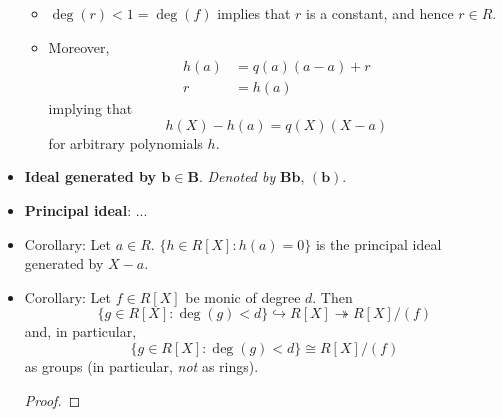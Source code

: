 \documentclass[../notes.tex]{subfiles}
\begin{document}
\begin{itemize}
\begin{itemize}
        \item $\deg(r)<1=\deg(f)$ implies that $r$ is a constant, and hence $r\in R$.
        \item Moreover,
        \begin{align*}
            h(a) &= q(a)(a-a)+r\\
            r &= h(a)
        \end{align*}
        implying that
        \begin{equation*}
            h(X)-h(a) = q(X)(X-a)
        \end{equation*}
        for arbitrary polynomials $h$.
    \end{itemize}
    \item \textbf{Ideal generated by $\bm{b\in B}$}. \emph{Denoted by} $\bm{Bb}$, $\bm{(b)}$.
    \item \textbf{Principal ideal}: ...
    \item Corollary: Let $a\in R$. $\{h\in R[X]:h(a)=0\}$ is the principal ideal generated by $X-a$.
    \item Corollary: Let $f\in R[X]$ be monic of degree $d$. Then
    \begin{equation*}
        \{g\in R[X]:\deg(g)<d\} \hookrightarrow R[X]
        \twoheadrightarrow R[X]/(f)
    \end{equation*}
    and, in particular,
    \begin{equation*}
        \{g\in R[X]:\deg(g)<d\} \cong R[X]/(f)
    \end{equation*}
    as groups (in particular, \emph{not} as rings).
    \begin{proof}


\end{proof}
\end{itemize}
\end{document}
